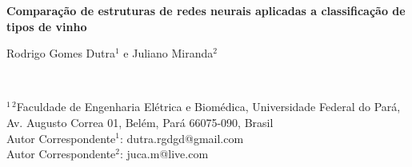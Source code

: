 



\begin{center}


\vspace*{2 cm}

\textsf{\bfseries 
\huge Comparação de estruturas de redes neurais aplicadas a classificação de tipos de vinho}



\vspace*{1.5 cm}

	\begin{large}
Rodrigo Gomes Dutra$^{1}$ e
Juliano Miranda$^{2}$
	\end{large} \\[1.7 mm]



	\begin{small}
$^{1\ 2}$Faculdade de Engenharia Elétrica e Biomédica, Universidade Federal do Pará, \\[1 mm]
Av. Augusto Correa 01, Belém, Pará 66075-090, Brasil \\[7 mm]



Autor Correspondente$^{1}$: dutra.rgdgd@gmail.com	\\[1 mm]
Autor Correspondente$^{2}$: juca.m@live.com

	\end{small}

\end{center}
 


